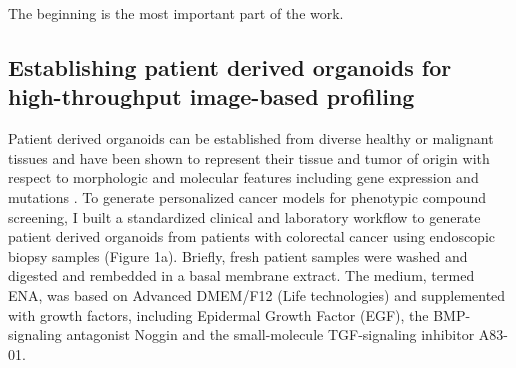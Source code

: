 \begin{savequote}[75mm]
The beginning is the most important part of the work.
\end{savequote}

\begin{flushleft}
\chapter{Establishing patient derived organoids for high-throughput image-based profiling}

Patient derived organoids can be established from diverse healthy or malignant tissues and have been shown to represent their tissue and tumor of origin with respect to morphologic and molecular features including gene expression and mutations \cite{Fujii:2016jo, Weeber2015-sn, Van_De_Wetering2015-ko, Sato:2011-1h,  Broutier2017-wg}. To generate personalized cancer models for phenotypic compound screening, I built a standardized clinical and laboratory workflow to generate patient derived organoids from patients with colorectal cancer using endoscopic biopsy samples (Figure 1a). Briefly, fresh patient samples were washed and digested and rembedded in a basal membrane extract. The medium, termed ENA, was based on Advanced DMEM/F12 (Life technologies) and supplemented with growth factors, including Epidermal Growth Factor (EGF), the BMP-signaling antagonist Noggin and the small-molecule TGF\beta-signaling inhibitor A83-01. 


\end{flushleft}
